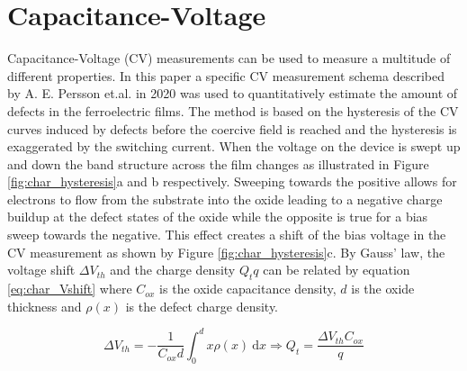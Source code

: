\documentclass[11pt,twoside]{eitExjobb}
\begin{document}
\section{Capacitance-Voltage}\label{sec:CV}
Capacitance-Voltage (CV) measurements can be used to measure a multitude of
different properties. In this paper a specific CV measurement schema described
by A. E. Persson et.al. in 2020 was used to quantitatively estimate the amount
of defects in the ferroelectric films. \cite{persson2020method} The method is
based on the hysteresis of the CV curves induced by defects before the coercive
field is reached and the hysteresis is exaggerated by the switching current.
When the voltage on the device is swept up and down the band structure across
the film changes as illustrated in Figure \ref{fig:char_hysteresis}a and b
respectively. Sweeping towards the positive allows for electrons to flow from
the  substrate into the oxide leading to a negative charge buildup at
the defect states of the oxide while the opposite is true for a bias sweep
towards the negative. This effect creates a shift of the bias voltage in the CV
measurement as shown by Figure \ref{fig:char_hysteresis}c. By Gauss' law, the
voltage shift $\Delta V_{th}$ and the charge density $Q_t q$ can be related by
equation \ref{eq:char_Vshift} where $C_{ox}$ is the oxide capacitance density,
$d$ is the oxide thickness and $\rho(x)$ is the defect charge density.

\begin{equation}\label{eq:char_Vshift}
    \Delta V_{th} = - \frac{1}{C_{ox}d} \int_0^d x\rho(x)\ \mathrm{d}x
    \Longrightarrow Q_t = \frac{\Delta V_{th}C_{ox}}{q}
\end{equation}
\end{document}
